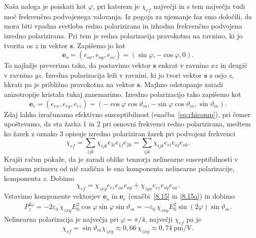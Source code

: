 Naša naloga je poiskati kot $\varphi$, pri katerem je 
$\chi_{ef}$ največji in s tem največja tudi moč frekvenčno podvojenega valovanja.
Iz pogoja za ujemanje faz smo določili, da mora biti vpadna svetloba redno polarizirana in 
izhodna frekvenčno podvojena izredno polarizirana. Pri tem je redna polarizacija pravokotna na 
ravnino, ki jo tvorita os $z$ in vektor $\mathbf{s}$. Zapišemo jo kot
\begin{equation}
\mathbf{e}_o=(e_{ox}, e_{oy}, e_{oz}) = (\sin\varphi,-\cos\varphi,0).
\label{8.15}
\end{equation}
To najlažje preverimo tako, da postavimo vektor $\mathbf{s}$ enkrat v ravnino $xz$ in
drugič v ravnino $yz$. Izredna polarizacija leži v ravnini, ki jo tvori 
vektor $\mathbf{s}$ z osjo $z$, hkrati pa je približno pravokotna na vektor $\mathbf{s}$. 
Majhno odstopanje zaradi anizotropije kristala tukaj zanemarimo. Izredno polarizacijo 
tako zapišemo kot  
\begin{equation}
\mathbf{e}_e=(e_{ex}, e_{ey}, e_{ez}) 
=(-\cos \varphi \cos \vartheta_m,-\sin \varphi \cos \vartheta_m ,\sin \vartheta_m).
\label{8.15a}
\end{equation}
Zdaj lahko izračunamo efektivno susceptibilnost (enačba~\ref{eq:chicomp}), 
pri čemer upoštevamo, da sta žarka 1 in 2 pri osnovni frekvenci redno polarizirana, medtem ko
žarek z oznako 3 opisuje izredno polariziran žarek pri podvojeni frekvenci
\begin{equation}
\chi_{ef} = \sum_{ijk} \chi_{ijk} e_{3i} e_{1j} e_{2k} = \sum_{ijk} \chi_{ijk} e_{ei} e_{oj} e_{ok}.
\end{equation}
Krajši račun pokaže, da je zaradi oblike tenzorja nelinearne susceptibilnosti v izbranem 
primeru od nič različna le ena komponenta nelinearne polarizacije, komponenta $z$. Dobimo
\begin{equation}
\chi_{ef} = \chi_{zxy} e_{ez} e_{ox} e_{oy} + \chi_{zyx} e_{ez} e_{oy} e_{ox}.
\end{equation}
Vstavimo komponente vektorjev $\mathbf{e}_o$ in $\mathbf{e}_e$ (enačbi~\ref{8.15} in \ref{8.15a}) in dobimo
\begin{align}
P_{z}^{2\omega}=- 2\varepsilon_0\, \chi_{zxy}E_{0}^2\cos\varphi\sin\varphi
\sin\vartheta_m = - \varepsilon_0\, \chi_{zxy}E_{0}^2\sin(2\varphi) \sin\vartheta_m.
\label{8.151}
\end{align}
Nelinearna polarizacija je največja pri $\varphi=\pi/4$, največji $\chi_{ef}$  pa je 
\begin{equation}
\chi_{ef}= 
\sin\vartheta_m \chi_{zxy} \approx 0,66\, \chi_{zxy} \approx 
0,74~\si{\pico\metre/\volt}.
\label{8.16}
\end{equation}

